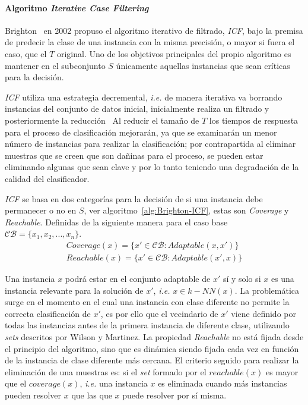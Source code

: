 \paragraph{Algoritmo \textit{Iterative Case Filtering}}\label{subsubsub:ICF}
\hfill \break
Brighton~\cite{brighton2002advances} en 2002 propuso el algoritmo iterativo de filtrado, \textit{ICF}, bajo la premisa de predecir la clase de una instancia con la misma precisión, o mayor si fuera el caso, que el $T$ original. Uno de los objetivos principales del propio algoritmo es mantener en el subconjunto $S$ únicamente aquellas instancias que sean críticas para la decisión.

\textit{ICF} utiliza una estrategia decremental, \textit{i.e.} de manera iterativa va borrando instancias del conjunto de datos inicial, inicialmente realiza un filtrado y posteriormente la reducción~\cite{brighton2002advances} Al reducir el tamaño de $T$ los tiempos de respuesta para el proceso de clasificación mejorarán, ya que se examinarán un menor número de instancias para realizar la clasificación; por contrapartida al eliminar muestras que se creen que son dañinas para el proceso, se pueden estar eliminando algunas que sean clave y por lo tanto teniendo una degradación de la calidad del clasificador.

\textit{ICF} se basa en dos categorías para la decisión de si una instancia debe permanecer o no en $S$, ver algoritmo~\ref{alg:Brighton-ICF}, estas son \textit{Coverage} y \textit{Reachable}. Definidas de la siguiente manera para el caso base $\mathcal{CB} = \lbrace x_1, x_2, ..., x_n\rbrace$.
\begin{align*}
Coverage (x) = \lbrace x' \in \mathcal{CB} : Adaptable(x, x')\rbrace  \\
Reachable (x) = \lbrace x' \in \mathcal{CB} : Adaptable(x',x)\rbrace
\end{align*}

Una instancia $x$ podrá estar en el conjunto adaptable de $x'$ sí y solo si $x$ es una instancia relevante para la solución de $x'$, \textit{i.e.} $x \in k-NN(x)$. La problemática surge en el momento en el cual una instancia con clase diferente no permite la correcta clasificación de $x'$, es por ello que el vecindario de $x'$ viene definido por todas las instancias antes de la primera instancia de diferente clase, utilizando \textit{sets} descritos por Wilson y Martinez. La propiedad \textit{Reachable} no está fijada desde el principio del algoritmo, sino que es dinámica siendo fijada cada vez en función de la instancia de clase diferente más cercana. El criterio seguido para realizar la eliminación de una muestras es: si el \textit{set} formado por el $reachable(x)$ es mayor que el $coverage(x)$, \textit{i.e.} una instancia $x$ es eliminada cuando más instancias pueden resolver $x$ que las que $x$ puede resolver por sí misma.

